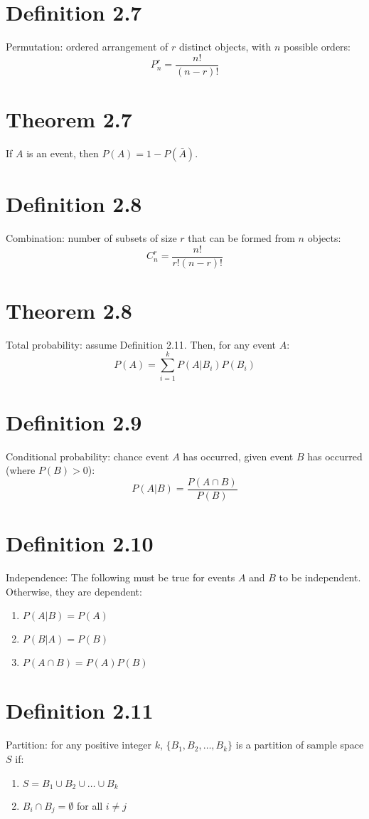 \documentclass[12pt]{article}
\begin{document}
\section{Definition 2.7}
Permutation: ordered arrangement of $r$ distinct objects, with $n$ possible orders:
\[
P_n^r = \frac{n!}{(n-r)!}
\]

\section{Theorem 2.7}
If $A$ is an event, then $P(A) = 1 - P(\bar{A})$.


\section{Definition 2.8}
Combination: number of subsets of size $r$ that can be formed from $n$ objects:
\[
C_n^r = \frac{n!}{r!(n-r)!}
\]

\section{Theorem 2.8}
Total probability: assume Definition 2.11. Then, for any event $A$:
\[
P(A) = \sum_{i=1}^k P(A|B_i)P(B_i)
\]

\section{Definition 2.9}
Conditional probability: chance event $A$ has occurred, given event $B$ has occurred (where $P(B) > 0$):
\[
P(A|B) = \frac{P(A \cap B)}{P(B)}
\]

\section{Definition 2.10}
Independence: The following must be true for events $A$ and $B$ to be independent. Otherwise, they are dependent:
\begin{enumerate}
  \item $P(A|B) = P(A)$
  \item $P(B|A) = P(B)$
  \item $P(A \cap B) = P(A)P(B)$
\end{enumerate}


\section{Definition 2.11}
Partition: for any positive integer $k$, $\{B_1, B_2, \ldots, B_k\}$ is a partition of sample space $S$ if:
\begin{enumerate}
  \item $S = B_1 \cup B_2 \cup \ldots \cup B_k$
  \item $B_i \cap B_j = \emptyset$ for all $i \neq j$
\end{enumerate}
\end{document}
